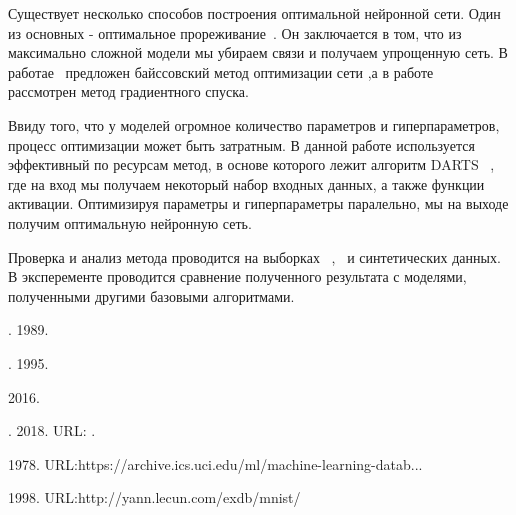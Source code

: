 \documentclass[12pt,twoside]{article}
\begin{document}
\par Существует несколько способов построения оптимальной нейронной сети. Один из основных - оптимальное прореживание~\cite{BrainDamage}. Он заключается в том, что из максимально сложной модели мы убираем связи и получаем упрощенную сеть. В работае~\cite{BayesOptim}  предложен байссовский метод оптимизации сети ,а в работе  ~\cite{GradientOptim} рассмотрен метод градиентного спуска.
\par Ввиду того, что у моделей огромное количество параметров и гиперпараметров, процесс оптимизации может быть затратным. В данной работе используется эффективный по ресурсам метод, в основе которого лежит алгоритм DARTS ~\cite{DARTS}, где на вход мы получаем некоторый набор входных данных, а также функции активации. Оптимизируя параметры и гиперпараметры паралельно, мы на выходе получим оптимальную нейронную сеть.
\par Проверка и анализ метода проводится на выборках ~\cite{Boston},~\cite{MNIST} и синтетических данных. В эксперементе проводится сравнение полученного результата с моделями, полученными другими базовыми алгоритмами.
\begin{thebibliography}{99}

. 1989.

. 1995.

 2016.

. 2018.
URL: .

 1978.
URL:{https://archive.ics.uci.edu/ml/machine-learning-datab..}.

 1998.
URL:{http://yann.lecun.com/exdb/mnist/}

\end{thebibliography}
\end{document}
